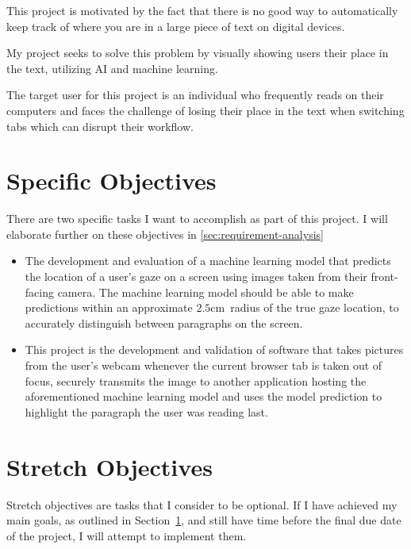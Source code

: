 \documentclass{report}
\begin{document}
This project is motivated by the fact that there is no good way to automatically keep track of where you are in a large piece of text on digital devices.

My project seeks to solve this problem by visually showing users their place in the text, utilizing AI and machine learning.

The target user for this project is an individual who frequently reads on their computers and faces the challenge of losing their place in the text when switching tabs which can disrupt their workflow.

\section{Specific Objectives}\label{sec:specific-objectives}

There are two specific tasks I want to accomplish as part of this project. I will elaborate further on these objectives in \autoref{sec:requirement-analysis}

\begin{itemize}
    \item The development and evaluation of a machine learning model that predicts the location of a user's gaze on a screen using images taken from their front-facing camera. The machine learning model should be able to make predictions within an approximate \(2.5\text{cm}\)~radius of the true gaze location, to accurately distinguish between paragraphs on the screen.
    \item This project is the development and validation of software that takes pictures from the user's webcam whenever the current browser tab is taken out of focus, securely transmits the image to another application hosting the aforementioned machine learning model and uses the model prediction to highlight the paragraph the user was reading last.
\end{itemize}

\section{Stretch Objectives}\label{sec:stretch-objectives}

Stretch objectives are tasks that I consider to be optional. If I have achieved my main goals, as outlined in Section~\ref{sec:specific-objectives}, and still have time before the final due date of the project, I will attempt to implement them.
\end{document}
